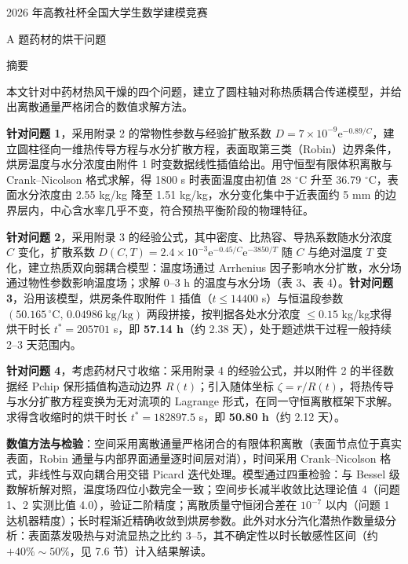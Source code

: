 \documentclass[12pt,a4paper]{ctexart}
\begin{document}
\begin{center}
{\heiti{} 2026 年高教社杯全国大学生数学建模竞赛\par}
\vspace{0.5em}
{\heiti{} A 题\quad 药材的烘干问题\par}
\end{center}

\vspace{0.6em}
\begin{center}
{\heiti{} 摘\quad 要}
\end{center}

本文针对中药材热风干燥的四个问题，建立了圆柱轴对称热质耦合传递模型，并给出离散通量严格闭合的数值求解方法。

\textbf{针对问题 1}，采用附录 2 的常物性参数与经验扩散系数 $D=7\times10^{-9}\mathrm{e}^{-0.89/C}$，建立圆柱径向一维热传导方程与水分扩散方程，表面取第三类（Robin）边界条件，烘房温度与水分浓度由附件 1 时变数据线性插值给出。用守恒型有限体积离散与 Crank--Nicolson 格式求解，得 1800 s 时表面温度由初值 28 $^\circ$C 升至 36.79 $^\circ$C，表面水分浓度由 2.55 kg/kg 降至 1.51 kg/kg，水分变化集中于近表面约 5 mm 的边界层内，中心含水率几乎不变，符合预热平衡阶段的物理特征。

\textbf{针对问题 2}，采用附录 3 的经验公式，其中密度、比热容、导热系数随水分浓度 $C$ 变化，扩散系数 $D(C,T)=2.4\times10^{-3}\mathrm{e}^{-0.45/C}\mathrm{e}^{-3850/T}$ 随 $C$ 与绝对温度 $T$ 变化，建立热质双向弱耦合模型：温度场通过 Arrhenius 因子影响水分扩散，水分场通过物性参数影响温度场；求解 0--3 h 的温度与水分场（表 3、表 4）。\textbf{针对问题 3}，沿用该模型，烘房条件取附件 1 插值（$t\le14400$ s）与恒温段参数 $(50.165\,^\circ\mathrm{C},\,0.04986\ \mathrm{kg/kg})$ 两段拼接，按判据各处水分浓度 $\le0.15$ kg/kg求得烘干时长 $t^*=205701$ s，即 \textbf{57.14 h}（约 2.38 天），处于题述烘干过程一般持续 2--3 天范围内。

\textbf{针对问题 4}，考虑药材尺寸收缩：采用附录 4 的经验公式，并以附件 2 的半径数据经 Pchip 保形插值构造动边界 $R(t)$；引入随体坐标 $\zeta=r/R(t)$，将热传导与水分扩散方程变换为无对流项的 Lagrange 形式，在同一守恒离散框架下求解。求得含收缩时的烘干时长 $t^*=182897.5$ s，即 \textbf{50.80 h}（约 2.12 天）。

\textbf{数值方法与检验}：空间采用离散通量严格闭合的有限体积离散（表面节点位于真实表面，Robin 通量与内部界面通量逐时间层对消），时间采用 Crank--Nicolson 格式，非线性与双向耦合用交错 Picard 迭代处理。模型通过四重检验：与 Bessel 级数解析解对照，温度场四位小数完全一致；空间步长减半收敛比达理论值 4（问题 1、2 实测比值 4.0），验证二阶精度；离散质量守恒闭合差在 $10^{-7}$ 以内（问题 1 达机器精度）；长时程渐近精确收敛到烘房参数。此外对水分汽化潜热作数量级分析：表面蒸发吸热与对流显热之比约 3--5，其不确定性以时长敏感性区间（约 $+40\%\sim50\%$，见 7.6 节）计入结果解读。
\end{document}
